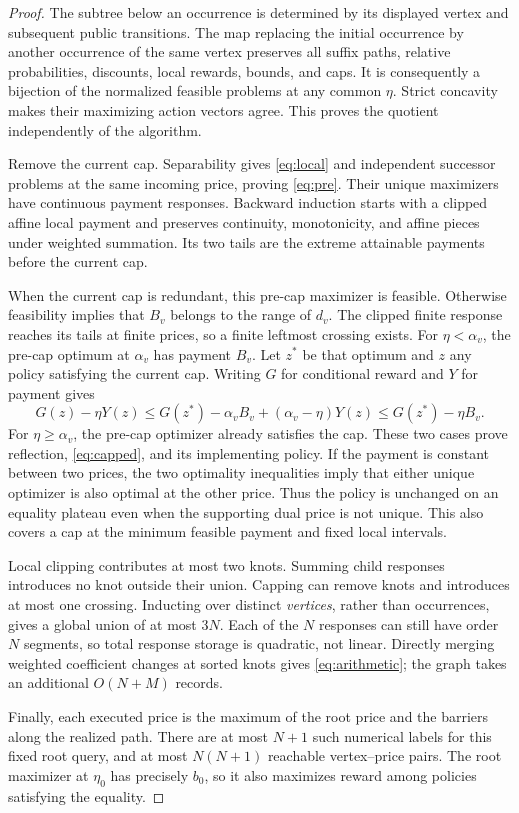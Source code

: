 \begin{proof}
The subtree below an occurrence is determined by its displayed vertex and subsequent public transitions. The map replacing the initial occurrence by another occurrence of the same vertex preserves all suffix paths, relative probabilities, discounts, local rewards, bounds, and caps. It is consequently a bijection of the normalized feasible problems at any common $\eta$. Strict concavity makes their maximizing action vectors agree. This proves the quotient independently of the algorithm.

Remove the current cap. Separability gives \eqref{eq:local} and independent successor problems at the same incoming price, proving \eqref{eq:pre}. Their unique maximizers have continuous payment responses. Backward induction starts with a clipped affine local payment and preserves continuity, monotonicity, and affine pieces under weighted summation. Its two tails are the extreme attainable payments before the current cap.

When the current cap is redundant, this pre-cap maximizer is feasible. Otherwise feasibility implies that $B_v$ belongs to the range of $d_v$. The clipped finite response reaches its tails at finite prices, so a finite leftmost crossing exists. For $\eta<\alpha_v$, the pre-cap optimum at $\alpha_v$ has payment $B_v$. Let $z^*$ be that optimum and $z$ any policy satisfying the current cap. Writing $G$ for conditional reward and $Y$ for payment gives
\[
 G(z)-\eta Y(z)\leq G(z^*)-\alpha_v B_v+(\alpha_v-\eta)Y(z)
 \leq G(z^*)-\eta B_v.
\]
For $\eta\geq\alpha_v$, the pre-cap optimizer already satisfies the cap. These two cases prove reflection, \eqref{eq:capped}, and its implementing policy. If the payment is constant between two prices, the two optimality inequalities imply that either unique optimizer is also optimal at the other price. Thus the policy is unchanged on an equality plateau even when the supporting dual price is not unique. This also covers a cap at the minimum feasible payment and fixed local intervals.

Local clipping contributes at most two knots. Summing child responses introduces no knot outside their union. Capping can remove knots and introduces at most one crossing. Inducting over distinct \emph{vertices}, rather than occurrences, gives a global union of at most $3N$. Each of the $N$ responses can still have order $N$ segments, so total response storage is quadratic, not linear. Directly merging weighted coefficient changes at sorted knots gives \eqref{eq:arithmetic}; the graph takes an additional $O(N+M)$ records.

Finally, each executed price is the maximum of the root price and the barriers along the realized path. There are at most $N+1$ such numerical labels for this fixed root query, and at most $N(N+1)$ reachable vertex--price pairs. The root maximizer at $\eta_0$ has precisely $b_0$, so it also maximizes reward among policies satisfying the equality.
\end{proof}

